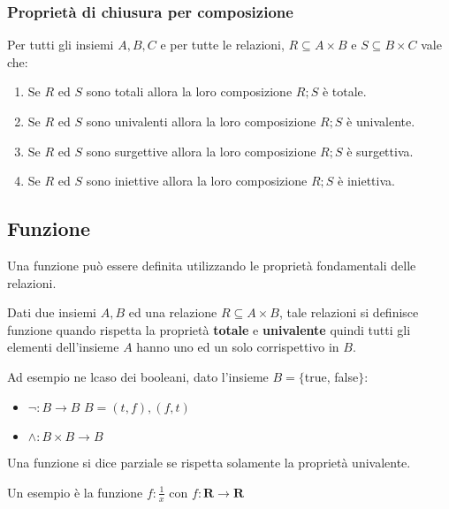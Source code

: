 
\subsubsection{Proprietà di chiusura per composizione}
Per tutti gli insiemi $A, B, C$ e per tutte le relazioni, $R \subseteq A \times B$ e $S \subseteq B \times C$ vale che:
\begin{enumerate}
    \item Se $R$ ed $S$ sono totali allora la loro composizione $R;S$ è totale.
    \item Se $R$ ed $S$ sono univalenti allora la loro composizione $R;S$ è univalente.
    \item Se $R$ ed $S$ sono surgettive allora la loro composizione $R;S$ è surgettiva.
    \item Se $R$ ed $S$ sono iniettive allora la loro composizione $R;S$ è iniettiva.
\end{enumerate}

\subsection{Funzione}
Una funzione può essere definita utilizzando le proprietà fondamentali delle relazioni.
\begin{definition}[Funzione]
Dati due insiemi $A, B$ ed una relazione $R \subseteq A \times B$, tale relazioni si definisce funzione quando rispetta la proprietà \textbf{totale} e \textbf{univalente} quindi tutti gli elementi dell'insieme $A$ hanno uno ed un solo corrispettivo in $B$.
\end{definition}
\begin{example}
	Ad esempio ne lcaso dei booleani, dato l'insieme $B=\{$true, false$\}$:
	\begin{itemize}
		\item $\neg : B \rightarrow B$ $B = {(t, f), (f, t)}$
		\item $\wedge : B \times B \rightarrow B$
	\end{itemize}
\end{example}

\begin{definition}
    Una funzione si dice parziale se rispetta solamente la proprietà univalente.
\end{definition}
\begin{example}
	Un esempio è la funzione $f:\frac{1}{x}$ con $f: \mathbf{R} \rightarrow \mathbf{R}$
\end{example}

